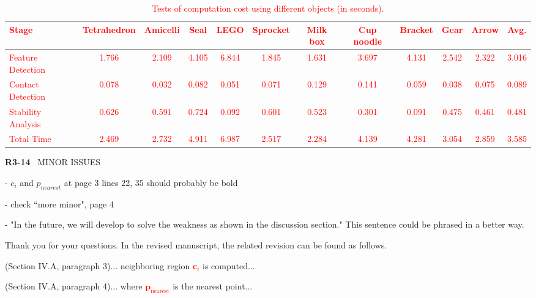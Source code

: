 \documentclass[journal]{IEEEtran}
\newcommand{\rev}[1]{\textcolor{red}{#1}}
\begin{document}
\begin{table}[ht]
    \centering
    \small
    \rev{
    \begin{threeparttable}
    \setlength{\tabcolsep}{5pt}
    \caption{\rev{Tests of computation cost using different objects (in seconds).}}
    \label{tab:computation_time}
    \begin{tabular}{l|cccccccccc|c}
        \toprule
        \textbf{Stage} & Tetrahedron & Amicelli & Seal & LEGO & Sprocket & Milk box & Cup noodle & Bracket & Gear & Arrow & \textbf{Avg.} \\
        \midrule
        Feature Detection & 1.766 & 2.109 & 4.105 & 6.844 & 1.845 & 1.631 & 3.697 & 4.131 & 2.542 & 2.322 & 3.016 \\
        Contact Detection & 0.078 & 0.032 & 0.082 & 0.051 & 0.071 & 0.129 & 0.141 & 0.059 & 0.038 & 0.075 & 0.089 \\
        Stability Analysis & 0.626 & 0.591 & 0.724 & 0.092 & 0.601 & 0.523 & 0.301 & 0.091 & 0.475 & 0.461 & 0.481\\
        Total Time & 2.469 & 2.732 & 4.911 & 6.987 & 2.517 & 2.284 & 4.139 & 4.281 & 3.054 & 2.859 & 3.585\\
        \bottomrule
    \end{tabular}
    \end{threeparttable}}
    
\end{table}


\bigskip

\noindent
{\textbf{\color{black}R3-14}\color{gray}~
MINOR ISSUES

- $c_i$ and $p_{nearest}$ at page 3 lines 22, 35 should probably be bold

- check ``more minor", page 4

- "In the future, we will develop to solve the weakness as shown in the discussion section." This sentence could be phrased in a better way.
}

Thank you for your questions. In the revised manuscript, the related revision can be found as follows.

(Section IV.A, paragraph 3)...
neighboring region \rev{\( \mathbf{c}_i \)} is computed...

(Section IV.A, paragraph 4)...
where \rev{\( \mathbf{p}_{\text{nearest}} \)} is the nearest point...
\end{document}

